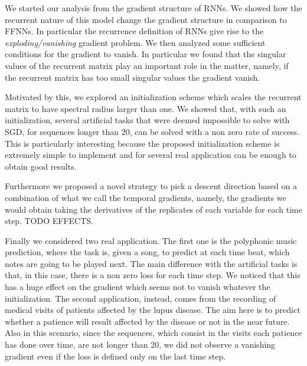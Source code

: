 We started our analysis from the gradient structure of RNNs. We showed how the recurrent nature of this model change the gradient structure in comparison to FFNNs. In particular the recurrence definition of RNNs give rise to the \textit{exploding/vanishing} gradient problem. We then analyzed some sufficient conditions for the gradient to vanish. In particular we found that the singular values of the recurrent matrix play an important role in the matter, namely, if the recurrent matrix has too small singular values the gradient vanish.

Motivated by this, we explored an initialization scheme which scales the recurrent matrix to have spectral radius larger than one. We showed that, with such an initialization, several artificial tasks that were deemed impossible to solve with SGD, for sequences longer than 20, can be solved with a non zero rate of success. This is particularly interesting because the proposed initialization scheme is extremely simple to implement and for several real application can be enough to obtain good results. 

Furthermore we proposed a novel strategy to pick a descent direction based on a combination of what we call the temporal gradients, namely, the gradients we would obtain taking the derivatives of the replicates of each variable for each time step. TODO EFFECTS. 

Finally we considered two real application. The first one is the polyphonic music prediction, where the task is, given a song, to predict at each time beat, which notes are going to be played next. The main difference with the artificial tasks is that, in this case, there is a non zero loss for each time step. We noticed that this has a huge effect on the gradient which seems not to vanish whatever the initialization. The second application, instead, comes from the recording of medical visits of patients affected by the lupus disease. The aim here is to predict whether a patience will result affected by the disease or not in the near future. Also in this scenario, since the sequences, which consist in the visits each patience has done over time, are not longer than 20, we did not observe a vanishing gradient even if the loss is defined only on the last time step. 